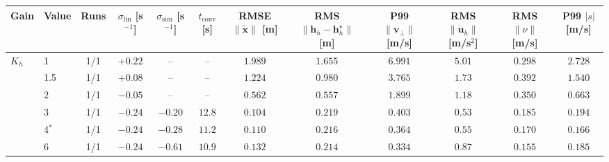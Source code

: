 \begin{tabular}{ll cccccccccc}
\toprule
Gain & Value & Runs & $\sigma_{\mathrm{lin}}$ [s$^{-1}$] & $\sigma_{\mathrm{sim}}$ [s$^{-1}$] & $t_{\mathrm{conv}}$ [s] & RMSE $\|\tilde{\mathbf{x}}\|$ [m] & RMS $\|\mathbf{h}_h-\mathbf{h}^\star_h\|$ [m] & P99 $\|\mathbf{v}_\perp\|$ [m/s] & RMS $\|\dot{\mathbf{u}}_h\|$ [m/s$^2$] & RMS $\|\nu\|$ [m/s] & P99 $|s|$ [m/s] \\
\midrule
$K_h$ & 1 & 1/1 & $+0.22$ & -- & -- & $1.989$ & $1.655$ & $6.991$ & $5.01$ & $0.298$ & $2.728$ \\
 & 1.5 & 1/1 & $+0.08$ & -- & -- & $1.224$ & $0.980$ & $3.765$ & $1.73$ & $0.392$ & $1.540$ \\
 & 2 & 1/1 & $-0.05$ & -- & -- & $0.562$ & $0.557$ & $1.899$ & $1.18$ & $0.350$ & $0.663$ \\
 & 3 & 1/1 & $-0.24$ & $-0.20$ & $12.8$ & $0.104$ & $0.219$ & $0.403$ & $0.53$ & $0.185$ & $0.194$ \\
 & 4$^{\ast}$ & 1/1 & $-0.24$ & $-0.28$ & $11.2$ & $0.110$ & $0.216$ & $0.364$ & $0.55$ & $0.170$ & $0.166$ \\
 & 6 & 1/1 & $-0.24$ & $-0.61$ & $10.9$ & $0.132$ & $0.214$ & $0.334$ & $0.87$ & $0.155$ & $0.185$ \\
\bottomrule
\end{tabular}
